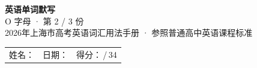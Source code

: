 \documentclass[10pt,a4paper]{article}
\begin{document}
\pagestyle{plain}

\begin{center}
{\LARGE\bfseries 英语单词默写}\\[0.22em]
{\large O 字母 · 第 2 / 3 份}\\[0.18em]
{\small 2026年上海市高考英语词汇用法手册 · 参照普通高中英语课程标准}
\end{center}

\vspace{0.25em}
\noindent\begin{tabular}{@{}p{}@{}p{}@{}p{}@{}}
姓名：\underline{\hspace{2.0cm}} & 日期：\underline{\hspace{2.0cm}} & 得分：\underline{\hspace{1.3cm}}\,/\,34 \\
\end{tabular}

\vspace{0.3em}

\vspace{0.08em}
\end{document}
